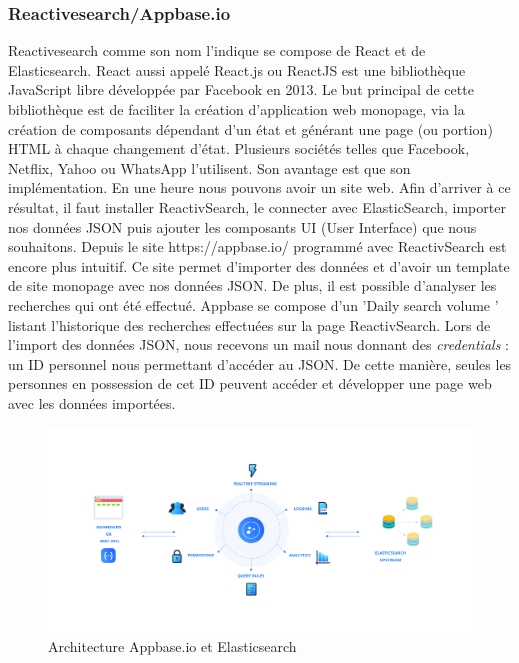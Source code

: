 \subsubsection{Reactivesearch/Appbase.io}

Reactivesearch comme son nom l’indique se compose de React et de Elasticsearch. React aussi appelé React.js ou ReactJS est une bibliothèque JavaScript libre développée par Facebook en 2013. Le but principal de cette bibliothèque est de faciliter la création d’application web monopage, via la création de composants dépendant d'un état et générant une page (ou portion) HTML à chaque changement d'état.
Plusieurs sociétés telles que Facebook, Netflix, Yahoo ou WhatsApp l’utilisent. Son avantage est que son implémentation. En une heure nous pouvons avoir un site web. Afin d’arriver à ce résultat, il faut installer ReactivSearch, le connecter avec ElasticSearch, importer nos données JSON puis ajouter les composants UI (User Interface) que nous souhaitons. 
Depuis le site https://appbase.io/ programmé avec ReactivSearch est encore plus intuitif. Ce site permet d’importer des données et d’avoir un template de site monopage avec nos données JSON. De plus, il est possible d’analyser les recherches qui ont été effectué. Appbase se compose d’un 'Daily search volume ' listant l’historique des recherches effectuées sur la page ReactivSearch. 
Lors de l’import des données JSON, nous recevons un mail nous donnant des \textit{credentials} : un ID personnel nous permettant d’accéder au JSON. De cette manière, seules les personnes en possession de cet ID peuvent accéder et développer une page web avec les données importées. 

\begin{figure}[h!]
  \centering
  \includegraphics[width=\textwidth]{images/ArchitectureElasticsearchAppbase.png}
	\caption[]{Architecture Appbase.io et Elasticsearch}
  \label{}
\end{figure}

